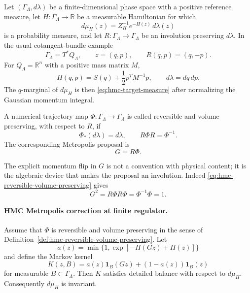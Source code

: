 Let \((\Gamma_\Lambda,d\lambda)\) be a finite-dimensional phase space with a
positive reference measure, let \(H:\Gamma_\Lambda\to\mathbb R\) be a
measurable Hamiltonian for which
\begin{equation}
  d\mu_H(z)
  =
  Z_H^{-1}e^{-H(z)}\,d\lambda(z)
  \label{eq:hmc-extended-measure}
\end{equation}
is a probability measure, and let \(R:\Gamma_\Lambda\to\Gamma_\Lambda\) be
an involution preserving \(d\lambda\).  In the usual cotangent-bundle example
\[
  \Gamma_\Lambda=T^*Q_\Lambda,\qquad z=(q,p),
  \qquad R(q,p)=(q,-p).
\]
For \(Q_\Lambda=\mathbb R^n\) with a positive mass matrix \(M\),
\begin{equation}
  H(q,p)=S(q)+\frac12 p^T M^{-1}p,
  \qquad
  d\lambda=dq\,dp .
  \label{eq:hmc-euclidean-hamiltonian}
\end{equation}
The \(q\)-marginal of \(d\mu_H\) is then \eqref{eq:hmc-target-measure} after
normalizing the Gaussian momentum integral.

\begin{definition}
\label{def:hmc-reversible-volume-preserving}
A numerical trajectory map \(\Phi:\Gamma_\Lambda\to\Gamma_\Lambda\) is
called reversible and volume preserving, with respect to \(R\), if
\begin{equation}
  \Phi_*(d\lambda)=d\lambda,
  \qquad
  R\Phi R=\Phi^{-1}.
  \label{eq:hmc-reversible-volume-preserving}
\end{equation}
The corresponding Metropolis proposal is
\begin{equation}
  G=R\Phi .
  \label{eq:hmc-involutive-proposal}
\end{equation}
\end{definition}

The explicit momentum flip in \(G\) is not a convention with physical
content; it is the algebraic device that makes the proposal an involution.
Indeed \eqref{eq:hmc-reversible-volume-preserving} gives
\[
  G^2=R\Phi R\Phi=\Phi^{-1}\Phi=1 .
\]

\paragraph{HMC Metropolis correction at finite regulator.}
Assume that \(\Phi\) is reversible and volume preserving in the sense of
Definition~\ref{def:hmc-reversible-volume-preserving}.  Let
\begin{equation}
  a(z)
  =
  \min\{1,\exp[-H(Gz)+H(z)]\}
  \label{eq:hmc-acceptance}
\end{equation}
and define the Markov kernel
\begin{equation}
  K(z,B)
  =
  a(z)\mathbf 1_B(Gz)+(1-a(z))\mathbf 1_B(z)
  \label{eq:hmc-metropolis-kernel}
\end{equation}
for measurable \(B\subset\Gamma_\Lambda\).  Then \(K\) satisfies detailed
balance with respect to \(d\mu_H\).  Consequently \(d\mu_H\) is invariant.

